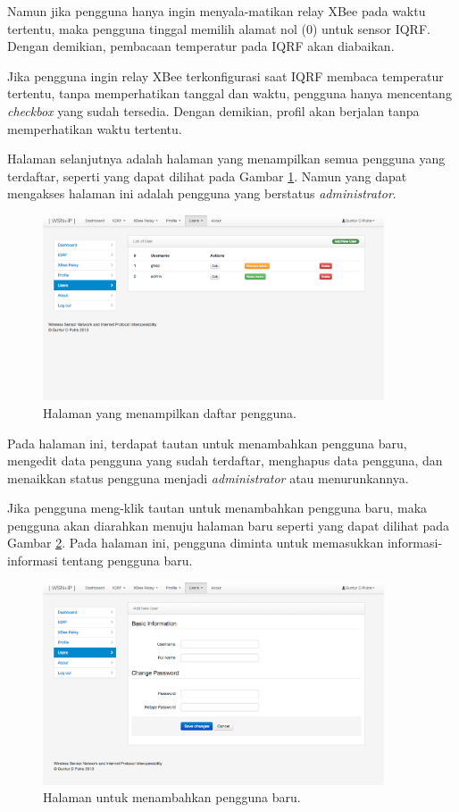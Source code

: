 			Namun jika pengguna hanya ingin menyala-matikan relay XBee pada waktu tertentu, maka pengguna tinggal memilih alamat nol (0) untuk sensor IQRF. Dengan demikian, pembacaan temperatur pada IQRF akan diabaikan.

			Jika pengguna ingin relay XBee terkonfigurasi saat IQRF membaca temperatur tertentu, tanpa memperhatikan tanggal dan waktu, pengguna hanya mencentang \emph{checkbox} yang sudah tersedia. Dengan demikian, profil akan berjalan tanpa memperhatikan waktu tertentu.

			Halaman selanjutnya adalah halaman yang menampilkan semua pengguna yang terdaftar, seperti yang dapat dilihat pada Gambar \ref{user-list}. Namun yang dapat mengakses halaman ini adalah pengguna yang berstatus \emph{administrator}.

				\begin{figure}[H]
				  \centering
				    \includegraphics[width=0.9\textwidth]{gambar/user-list}
				    \caption{Halaman yang menampilkan daftar pengguna.}
				    \label{user-list}
				\end{figure}

			Pada halaman ini, terdapat tautan untuk menambahkan pengguna baru, mengedit data pengguna yang sudah terdaftar, menghapus data pengguna, dan menaikkan status pengguna menjadi \emph{administrator} atau menurunkannya.

			Jika pengguna meng-klik tautan untuk menambahkan pengguna baru, maka pengguna akan diarahkan menuju halaman baru seperti yang dapat dilihat pada Gambar \ref{user-add}. Pada halaman ini, pengguna diminta untuk memasukkan informasi-informasi tentang pengguna baru.

				\begin{figure}[H]
				  \centering
				    \includegraphics[width=0.9\textwidth]{gambar/user-add}
				    \caption{Halaman untuk menambahkan pengguna baru.}
				    \label{user-add}
				\end{figure}

